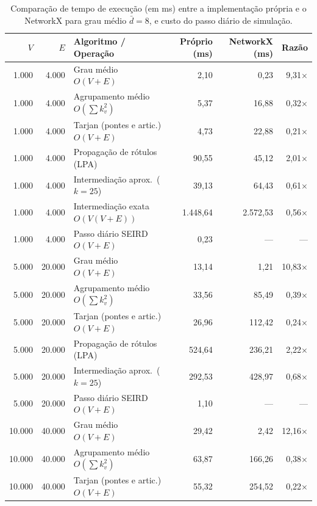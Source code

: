 \documentclass[11pt]{article}
\begin{document}
\begin{table}[!ht]
\centering
\caption{Comparação de tempo de execução (em ms) entre a implementação própria e o NetworkX para grau médio $\bar{d} = 8$, e custo do passo diário de simulação.}
\label{tab:benchmark_networkx}
\footnotesize
\renewcommand{\arraystretch}{0.92}
\begin{tabular}{rrlrrr}
\hline
\textbf{$V$} & \textbf{$E$} & \textbf{Algoritmo / Operação} & \textbf{Próprio (ms)} & \textbf{NetworkX (ms)} & \textbf{Razão} \\
\hline
1.000  & 4.000   & Grau médio $O(V+E)$               & 2,10     & 0,23     & 9,31$\times$ \\
1.000  & 4.000   & Agrupamento médio $O(\sum k_v^2)$ & 5,37     & 16,88    & 0,32$\times$ \\
1.000  & 4.000   & Tarjan (pontes e artic.) $O(V+E)$ & 4,73     & 22,88    & 0,21$\times$ \\
1.000  & 4.000   & Propagação de rótulos (LPA)       & 90,55    & 45,12    & 2,01$\times$ \\
1.000  & 4.000   & Intermediação aprox.\ ($k=25$)    & 39,13    & 64,43    & 0,61$\times$ \\
1.000  & 4.000   & Intermediação exata $O(V(V+E))$   & 1.448,64 & 2.572,53 & 0,56$\times$ \\
1.000  & 4.000   & Passo diário SEIRD $O(V+E)$       & 0,23     & ---      & ---          \\
\hline
5.000  & 20.000  & Grau médio $O(V+E)$               & 13,14    & 1,21     & 10,83$\times$ \\
5.000  & 20.000  & Agrupamento médio $O(\sum k_v^2)$ & 33,56    & 85,49    & 0,39$\times$ \\
5.000  & 20.000  & Tarjan (pontes e artic.) $O(V+E)$ & 26,96    & 112,42   & 0,24$\times$ \\
5.000  & 20.000  & Propagação de rótulos (LPA)       & 524,64   & 236,21   & 2,22$\times$ \\
5.000  & 20.000  & Intermediação aprox.\ ($k=25$)    & 292,53   & 428,97   & 0,68$\times$ \\
5.000  & 20.000  & Passo diário SEIRD $O(V+E)$       & 1,10     & ---      & ---          \\
\hline
10.000 & 40.000  & Grau médio $O(V+E)$               & 29,42    & 2,42     & 12,16$\times$ \\
10.000 & 40.000  & Agrupamento médio $O(\sum k_v^2)$ & 63,87    & 166,26   & 0,38$\times$ \\
10.000 & 40.000  & Tarjan (pontes e artic.) $O(V+E)$ & 55,32    & 254,52   & 0,22$\times$ \\

\end{tabular}
\end{table}
\end{document}
